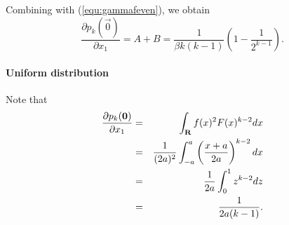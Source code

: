 Combining with (\ref{equ:gammafeven}), we obtain
$$
\frac{\partial p_k(\vec{0})}{\partial x_1} = A+B = \frac{1}{\beta k(k-1)}\left(1-\frac{1}{2^{k-1}}\right).
$$

\paragraph{Uniform distribution} Note that
\begin{eqnarray*}
\frac{\partial p_k(\mathbf{0})}{\partial x_1} &=& \int_{\mathbf{R}} f(x)^2 F(x)^{k-2}dx\\
&=& \frac{1}{(2a)^2}\int_{-a}^a \left(\frac{x+a}{2a}\right)^{k-2}dx\\
&=& \frac{1}{2a} \int_0^1 z^{k-2}dz\\
&=& \frac{1}{2a (k-1)}.
\end{eqnarray*}



